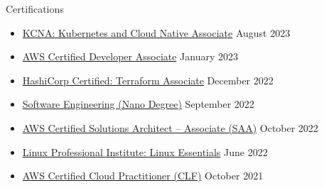 \documentclass[a4paper]{article}
\newlength{\tabin}
\newlength{\secsep}
\newcommand{\lineunder}{\vspace*{-8pt}\\\hspace*{-6pt}\hrulefill\\\vspace*{-15pt}}
\newenvironment{tabbedsection}[1]{
  \begin{list}{}{
    \setlength{\itemsep}{0pt}
    \setlength{\labelsep}{0pt}
    \setlength{\labelwidth}{0pt}
    \setlength{\leftmargin}{\tabin}
    \setlength{\rightmargin}{\tabin}
    \setlength{\listparindent}{0pt}
    \setlength{\parsep}{0pt}
    \setlength{\parskip}{0pt}
    \setlength{\partopsep}{0pt}
    \setlength{\topsep}{#1}
  }
  \item[]
}{\end{list}}
\newenvironment{resume_section}[1]{
  \filbreak
  \vspace{2\secsep}
  \textsc{\large#1}
  \lineunder
  \begin{tabbedsection}{\secsep}
}{\end{tabbedsection}}
\newenvironment{subitems}{
  \renewcommand{\labelitemi}{-}
  \begin{itemize}
  \setlength{\labelsep}{1em}
}{\end{itemize}}
\begin{document}
\begin{resume_section}{Certifications}
  \begin{subitems}
    \item \href{https://www.credly.com/earner/earned/badge/f57b9d96-2c03-45dd-bdd2-95b0f464f791}{KCNA: Kubernetes and Cloud Native Associate} \hfill August 2023
    \item \href{https://www.credly.com/earner/earned/badge/2b82f982-3f60-455c-82a4-082679866c3d}{AWS Certified Developer Associate} \hfill January 2023
    \item \href{https://www.credly.com/badges/26043bb9-cca6-4c6c-80ae-51a4ef85da84}{HashiCorp Certified: Terraform Associate} \hfill December 2022
    \item \href{}{Software Engineering (Nano Degree)} \hfill September 2022
    \item \href{https://www.credly.com/earner/earned/badge/1751ff0d-b1f8-4eee-993f-98766dc6ccea}{AWS Certified Solutions Architect -- Associate (SAA)} \hfill October 2022
    \item \href{https://cs.lpi.org/caf/Xamman/certification/verify/LPI000527039/yt3tc4dc54}{Linux Professional Institute: Linux Essentials} \hfill June 2022
    \item \href{https://www.credly.com/earner/earned/badge/fe5ff96d-d745-4a2e-a2a7-a88d49875938}{AWS Certified Cloud Practitioner (CLF)} \hfill October 2021
  \end{subitems}
\end{resume_section}
\end{document}
